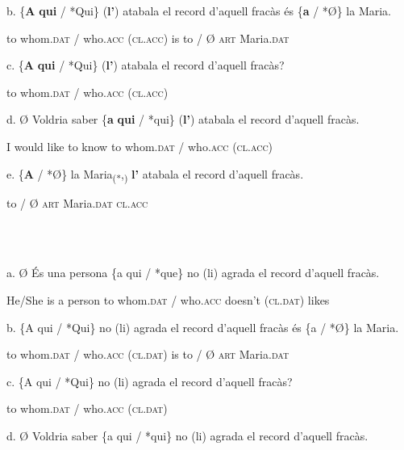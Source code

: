 \documentclass[output=paper,modfonts,nonflat]{langsci/langscibook}
\begin{document}
         b. \{\textbf{A} \textbf{qui}              / *Qui\}       (\textbf{l’})         atabala el  record d’aquell fracàs és \{\textbf{a} / *Ø\} la   Maria.

              to whom.\textsc{dat} /   who.\textsc{acc} (\textsc{cl.acc})                                                      is    to /  Ø  \textsc{art} Maria.\textsc{dat}

       c. \{\textbf{A} \textbf{qui}             / *Qui\}        (\textbf{l’})         atabala el record d’aquell fracàs?

            to whom.\textsc{dat} /   who.\textsc{acc} (\textsc{cl.acc})

       d. Ø Voldria      saber      \{\textbf{a}  \textbf{qui}             / *qui\}         (\textbf{l’})         atabala el record d’aquell fracàs.

             I  would like to know   to whom.\textsc{dat} /   who.\textsc{acc} (\textsc{cl.acc})

       e. \{\textbf{A} / *Ø\} la    Maria\textsubscript{(*},\textsubscript{)}     \textbf{l’}          atabala el record d’aquell fracàs.

            to /   Ø   \textsc{art} Maria.\textsc{dat} \textsc{cl.acc}

\ea%
    \label{ex:key:15}
    \gll\\
        \\
    \glt
    \z

         a. Ø          És una persona \{a  qui             / *que\}        no        (li)           agrada el record d’aquell fracàs.

              He/She is  a     person     to whom.\textsc{dat} / who.\textsc{acc} doesn’t (\textsc{cl.dat}) likes

          b. \{A qui             / *Qui\}       no (li)        agrada el record d’aquell fracàs és \{a  / *Ø\} la   Maria.

               to whom.\textsc{dat} / who.\textsc{acc}       (\textsc{cl.dat})                                                  is   to  /   Ø \textsc{art} Maria.\textsc{dat}

        c. \{A  qui            / *Qui\}        no (li)          agrada el record d’aquell fracàs?

             to whom.\textsc{dat} /  who.\textsc{acc}       (\textsc{cl.dat})

          d. Ø Voldria saber \{a  qui              / *qui\}        no (li)          agrada el record d’aquell fracàs.
\end{document}
